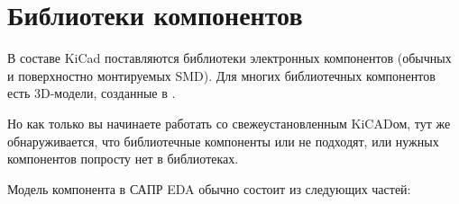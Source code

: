 \section{Библиотеки компонентов}

\bigskip

В составе KiCad поставляются библиотеки электронных компонентов (обычных и
поверхностно монтируемых SMD). Для многих библиотечных компонентов есть
3D-модели, созданные в .

Но как только вы начинаете работать со свежеустановленным KiCADом, тут же
обнаруживается, что библиотечные компоненты или не подходят, или нужных компонентов попросту
нет в библиотеках.

Модель компонента в САПР EDA обычно состоит из следующих частей:

